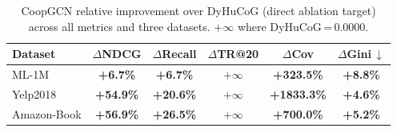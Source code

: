 \begin{table}[t]\centering
\caption{CoopGCN relative improvement over DyHuCoG (direct ablation target) across all metrics and three datasets. $+\infty$ where DyHuCoG\,=\,0.0000.}
\label{tab:gain}
\begin{tabular}{l ccccc}\toprule
\textbf{Dataset} & $\Delta$\textbf{NDCG} & $\Delta$\textbf{Recall} & $\Delta$\textbf{TR@20} & $\Delta$\textbf{Cov} & $\Delta$\textbf{Gini\,$\downarrow$} \\
\midrule
ML-1M & \textbf{+6.7\%} & \textbf{+6.7\%} & $+\infty$ & \textbf{+323.5\%} & \textbf{+8.8\%} \\
Yelp2018 & \textbf{+54.9\%} & \textbf{+20.6\%} & $+\infty$ & \textbf{+1833.3\%} & \textbf{+4.6\%} \\
Amazon-Book & \textbf{+56.9\%} & \textbf{+26.5\%} & $+\infty$ & \textbf{+700.0\%} & \textbf{+5.2\%} \\
\bottomrule
\end{tabular}
\end{table}